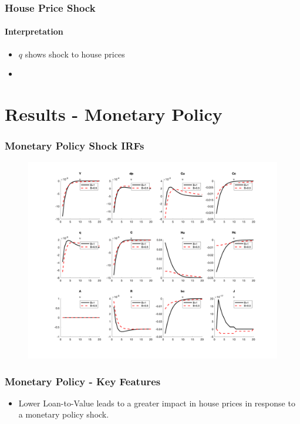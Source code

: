 \documentclass{beamer}
\begin{document}
\begin{frame}
	\frametitle{House Price Shock}
	\framesubtitle{Interpretation}	
	
	\begin{itemize}
  \item $q$ shows shock to house prices
  \item
 \end{itemize}

	
\end{frame}


\section{Results - Monetary Policy}

\begin{frame}
	\frametitle{Monetary Policy Shock IRFs}
	
	\begin{figure}[H]\centering
  \includegraphics[scale=0.3]{../figs/_u}
\end{figure}
	
\end{frame}

\begin{frame}
	\frametitle{Monetary Policy - Key Features}
	\begin{itemize}
  \item Lower Loan-to-Value leads to a greater impact in house prices in response to a monetary policy shock.
\end{itemize}
\end{frame}
\end{document}
